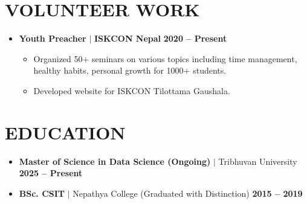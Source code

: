 \documentclass[10pt,a4paper]{article}
\begin{document}
\section{VOLUNTEER WORK}
\begin{itemize}[leftmargin=1em, label={}]
    \item \textbf{Youth Preacher} $|$ \textbf{ISKCON Nepal} \hfill \textbf{2020 -- Present} 
    \begin{itemize}
        \item Organized 50+ seminars on various topics including time management, healthy habits, personal growth for 1000+ students.
        \item Developed website for ISKCON Tilottama Gaushala.
    \end{itemize}
\end{itemize}

\section{EDUCATION}
\begin{itemize}
    \item \textbf{Master of Science in Data Science (Ongoing)} $|$ Tribhuvan University \hfill \textbf{2025 -- Present}
    \item \textbf{BSc. CSIT} $|$ Nepathya College (Graduated with Distinction) \hfill \textbf{2015 -- 2019}
\end{itemize}
\end{document}
